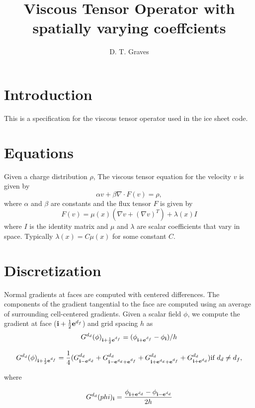 \documentclass{article}
\newcommand{\ebold}{{\bf e}}
\newcommand{\ibold}{{\bf i}}
\newcommand{\half}{{\frac{1}{2}}}
\newcommand{\iphf}{{\ibold  + \half\ebold^{d_f}}}
\newcommand{\ipf} {{\ibold  +      \ebold^{d_f}}}
\newcommand{\ipo}{{\ibold   +      \ebold^{d_d}}}
\newcommand{\imo}{{\ibold   -      \ebold^{d_d}}}
\newcommand{\lolo}{{\ibold  -      \ebold^{d_d}}}
\newcommand{\hilo}{{\ibold  +      \ebold^{d_d}}}
\newcommand{\lohi}{{\ibold  -      \ebold^{d_d}  +      \ebold^{d_f}}}
\newcommand{\hihi}{{\ibold  +      \ebold^{d_d}  +      \ebold^{d_f}}}
\begin{document}

\title{Viscous Tensor Operator with spatially varying coeffcients}

\author{D. T. Graves}

\section{Introduction}
  This is a specification for the viscous tensor operator used
  in the ice sheet code.

\section{Equations}

Given a charge distribution $\rho$, The viscous tensor equation for
the velocity $v$ is given by
$$
\alpha v + \beta \nabla \cdot F(v) = \rho,
$$
where $\alpha$ and $\beta$ are constants and the flux tensor $F$ is
given by
$$
F(v) = \mu(x) (\nabla v + (\nabla v)^T) + \lambda(x) I 
$$
where $I$ is the identity matrix and $\mu$ and $\lambda$ are scalar
coefficients that vary in space.   Typically $\lambda(x) = C \mu(x)$ for
some constant $C$.

\section{Discretization}

Normal gradients at faces are computed with  centered differences.
The components of the gradient tangential to the face are computed
using an average of surrounding cell-centered gradients.   Given a
scalar field $\phi$, we compute the gradient at face ($\iphf$) and grid
spacing $h$ as
$$
G^{d_d}(\phi)_{\iphf} = (\phi_{\ipf}-\phi_{\ibold})/{h}
$$

$$
G^{d_d}(\phi)_\iphf = \frac{1}{4}(G^{d_d}_{\lolo} + G^{d_d}_{\lohi} +G^{d_d}_{\hihi}  + G^{d_d}_{\hilo})   \mbox{if $d_d \ne d_f$},
$$

where

$$
G^{d_d}(phi)_\ibold = \frac{\phi_{\ipo} - \phi_{\imo}}{2 h}
$$
\end{document}
